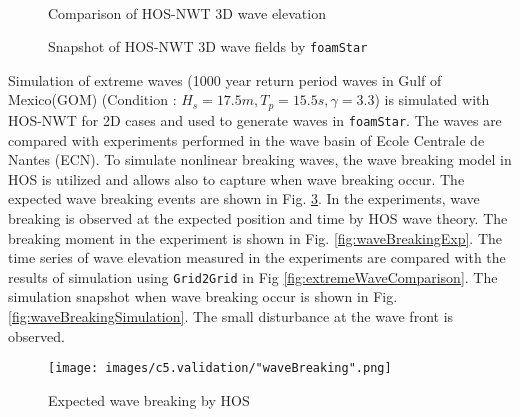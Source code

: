 	\pagebreak
	
	{
		\begin{figure} [H]
			\centering
			 \\
			\vspace{0.2cm}
			\caption{Comparison of HOS-NWT 3D wave elevation}
			\label{fig:HOSNWT_3DWaveElevation}
		\end{figure}
	}
	
	{
		\begin{figure} [H]
			\centering
			 \quad
			\vspace{0.2cm}
			\caption{Snapshot of HOS-NWT 3D wave fields by \texttt{foamStar}}
			\label{fig:HOSNWT_3DSnapshot}
		\end{figure}
	}
	
	\pagebreak
	
	Simulation of extreme waves (1000 year return period waves in Gulf of Mexico(GOM) (Condition : $H_s=17.5 m, T_p=15.5 s, \gamma=3.3$) is simulated with HOS-NWT for 2D cases and used to generate waves in \texttt{foamStar}. The waves are compared with experiments performed in the wave basin of Ecole Centrale de Nantes (ECN). To simulate nonlinear breaking waves, the wave breaking model in HOS is utilized and allows also to capture when wave breaking occur. The expected wave breaking events are shown in Fig. \ref{fig:waveBreakingEvents}. In the experiments, wave breaking is observed at the expected position and time by HOS wave theory. The breaking moment in the experiment is shown in Fig. \ref{fig:waveBreakingExp}. The time series of wave elevation measured in the experiments are compared with the results of simulation using \texttt{Grid2Grid} in Fig \ref{fig:extremeWaveComparison}. The simulation snapshot when wave breaking occur is shown in Fig. \ref{fig:waveBreakingSimulation}. The small disturbance at the wave front is observed.
	
	{
		\begin{figure} [H]
			\centering
			\texttt{[image: images/c5.validation/"waveBreaking".png]}
			\caption{Expected wave breaking by HOS}
			\label{fig:waveBreakingEvents}
		\end{figure}
	}

